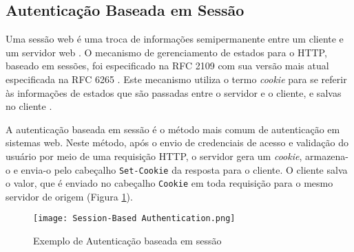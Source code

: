 \subsection{Autenticação Baseada em Sessão}

Uma sessão web é uma troca de informações semipermanente entre um cliente e um servidor web 
\cite{CALZAVARA2017}. O mecanismo de gerenciamento de estados para o HTTP, baseado em sessões, foi 
especificado na RFC 2109 \cite{RFC2109} com sua versão mais atual especificada na RFC 6265 
\cite{RFC6265}. Este mecanismo utiliza o termo \emph{cookie} para se referir às informações de 
estados que são passadas entre o servidor e o cliente, e salvas no cliente \cite{RFC2109}. 

A autenticação baseada em sessão é o método mais comum de autenticação em sistemas web. Neste 
método, após o envio de credenciais de acesso e validação do usuário por meio de uma requisição 
HTTP, o servidor gera um \emph{cookie}, armazena-o e envia-o pelo cabeçalho \texttt{Set-Cookie} da 
resposta para o cliente. O cliente salva o valor, que é enviado no cabeçalho \texttt{Cookie} em 
toda requisição para o mesmo servidor de origem \cite{PAPATHANASAKI2022} (Figura \ref{fig:sessionAuth}).

\begin{figure}[ht]
  \centering
  \texttt{[image: Session-Based Authentication.png]}
  \caption{Exemplo de Autenticação baseada em sessão}
  \label{fig:sessionAuth}
\end{figure}